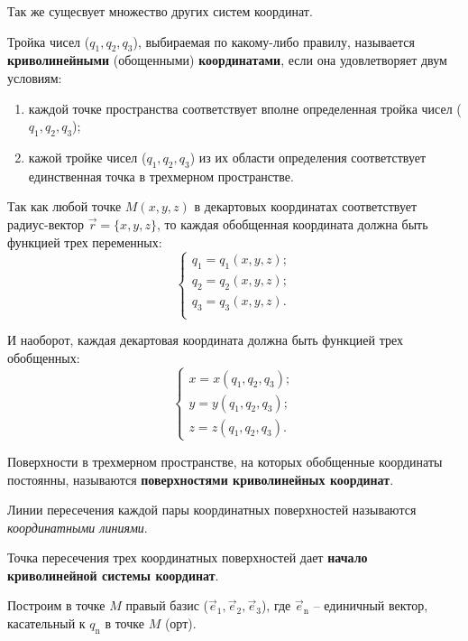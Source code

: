 	Так же сущесвует множество других систем координат.
	
	\begin{definition}
	Тройка чисел (\( q_1, q_2, q_3 \)), выбираемая по какому-либо правилу, называется \textbf{криволинейными} (обощенными) \textbf{координатами}, если она удовлетворяет двум условиям:
	\begin{enumerate}
	\item каждой точке пространства соответствует вполне определенная тройка чисел (\( q_1, q_2, q_3 \));
	\item кажой тройке чисел (\( q_1, q_2, q_3 \)) из их области определения соответствует единственная точка в трехмерном пространстве.
	\end{enumerate}
	\end{definition}
	
	Так как любой точке \( M(x, y, z) \) в декартовых координатах соответствует радиус-вектор \( \vec{r} = \{ x, y, z \} \), то каждая обобщенная координата должна быть функцией трех переменных:
	\[ \left\{ \begin{array}{l}
		q_1 = q_1(x, y, z); \\
		q_2 = q_2(x, y, z); \\
		q_3 = q_3(x, y, z). \\
	\end{array} \right. \]
	
	И наоборот, каждая декартовая координата должна быть функцией трех обобщенных:
	\[ \left\{ \begin{array}{l}
		x = x(q_1, q_2, q_3); \\
		y = y(q_1, q_2, q_3); \\
		z = z(q_1, q_2, q_3).
	\end{array} \right. \]

	\begin{definition}
	Поверхности в трехмерном пространстве, на которых обобщенные координаты постоянны, называются \textbf{поверхностями криволинейных координат}.
	\end{definition}
	
	\begin{definition}
	Линии пересечения каждой пары координатных поверхностей называются \textit{координатными линиями}.
	
	Точка пересечения трех координатных поверхностей дает \textbf{начало криволинейной системы координат}.
	\end{definition}

	Построим в точке \( M \) правый базис (\( \vec{e}_1, \vec{e}_2, \vec{e}_3 \)), где \( \vec{e}_\mathrm{n} \) -- единичный вектор, касательный к \( q_\mathrm{n} \) в точке \( M \) (орт).
	
